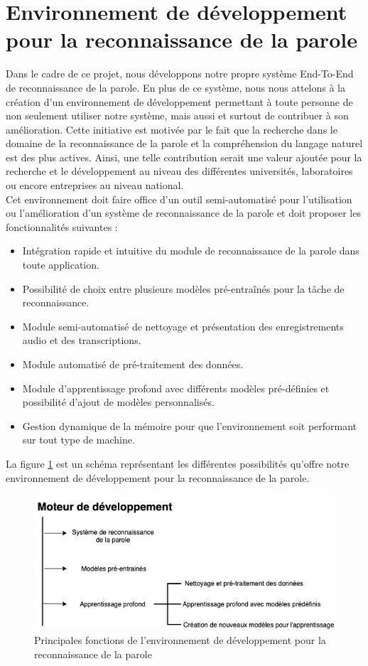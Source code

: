 \section{Environnement de développement pour la reconnaissance de la parole}
Dans le cadre de ce projet, nous développons notre propre système End-To-End de reconnaissance de la parole. En plus de ce système, nous nous attelons à la création d'un environnement de développement permettant à toute personne de non seulement utiliser notre système, mais aussi et surtout de contribuer à son amélioration. Cette initiative est motivée par le fait que la recherche dans le domaine de la reconnaissance de la parole et la compréhension du langage naturel est des plus actives. Ainsi, une telle contribution serait une valeur ajoutée pour la recherche et le développement au niveau des différentes universités, laboratoires ou encore entreprises au niveau national.\\
Cet environnement doit faire office d'un outil semi-automatisé pour l'utilisation ou l'amélioration d'un système de reconnaissance de la parole et doit proposer les fonctionnalités suivantes : 
\begin{itemize}
    \item Intégration rapide et intuitive du module de reconnaissance de la parole dans toute application.
    \item Possibilité de choix entre plusieurs modèles pré-entraînés pour la tâche de reconnaissance.
    \item Module semi-automatisé de nettoyage et présentation des enregistrements audio et des transcriptions.
    \item Module automatisé de pré-traitement des données.
    \item Module d'apprentissage profond avec différents modèles pré-définies et possibilité d'ajout de modèles personnalisés.
    \item Gestion dynamique de la mémoire pour que l'environnement soit performant sur tout type de machine. \\
\end{itemize}

La figure \ref{pip_dev} est un schéma représentant les différentes possibilités qu'offre notre environnement de développement pour la reconnaissance de la parole.

 \begin{figure}[H]
     \centering
     \includegraphics[width=400pt]{images/chap3/Pipeline_moteur_V1.png}
     \caption{Principales fonctions de l'environnement de développement pour la reconnaissance de la parole}
     \label{pip_dev}
 \end{figure}

